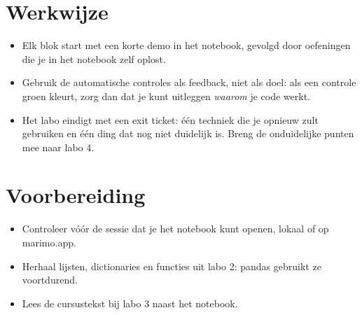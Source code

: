 \documentclass[11pt,a4paper]{article}
\begin{document}


\section{Werkwijze}

\begin{itemize}
  \item Elk blok start met een korte demo in het notebook, gevolgd door
        oefeningen die je in het notebook zelf oplost.
  \item Gebruik de automatische controles als feedback, niet als doel:
        als een controle groen kleurt, zorg dan dat je kunt uitleggen
        \emph{waarom} je code werkt.
  \item Het labo eindigt met een exit ticket: één techniek die je opnieuw
        zult gebruiken en één ding dat nog niet duidelijk is. Breng de
        onduidelijke punten mee naar labo 4.
\end{itemize}

\section{Voorbereiding}

\begin{itemize}
  \item Controleer vóór de sessie dat je het notebook kunt openen,
        lokaal of op marimo.app.
  \item Herhaal lijsten, dictionaries en functies uit labo 2: pandas
        gebruikt ze voortdurend.
  \item Lees de cursustekst bij labo 3 naast het notebook.
\end{itemize}
\end{document}
